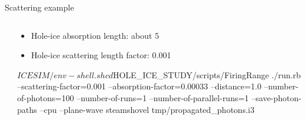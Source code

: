 
\begin{frame}[fragile]{Scattering example}

  \begin{columns}
    \begin{column}{0.5\textwidth}


    \end{column}

    \begin{column}{0.5\textwidth}

      \begin{itemize}
        \item Hole-ice absorption length: about 5\cm
        \item Hole-ice scattering length factor: 0.001
      \end{itemize}

      \begin{smallbash}
        $ICESIM/env-shell.sh
        cd $HOLE_ICE_STUDY/scripts/FiringRange
        ./run.rb --scattering-factor=0.001 --absorption-factor=0.00033 --distance=1.0 --number-of-photons=100 --number-of-runs=1 --number-of-parallel-runs=1 --save-photon-paths --cpu --plane-wave
        steamshovel tmp/propagated_photons.i3
      \end{smallbash}

    \end{column}

  \end{columns}
\end{frame}
